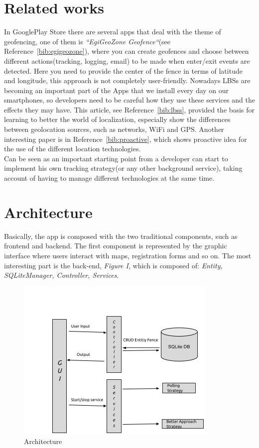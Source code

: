 \documentclass[conference]{IEEEtran}
\begin{document}
\section{Related works}
In GooglePlay Store there are several apps that deal with the theme of geofencing, one of them is 
\textit{``EgiGeoZone Geofence``}(see Reference~\ref{bib:egigeozone}), where you can create geofences and choose between different actions(tracking, logging, email) to be made when enter/exit events are detected.
Here you need to provide the center of the fence in terms of latitude and longitude, this approach is not completely user-friendly.
Nowadays LBSs are becoming an important part of the Apps that we install every day on our smartphones, so developers need to be careful how they use 
these services and the effects they may have.
This article, see Reference~\ref{bib:lbss}, provided the basis for learning to better the world of localization, especially show the differences between geolocation sources, 
such as networks, WiFi and GPS.
Another interesting paper is in Reference~\ref{bib:proactive}, which shows proactive idea for the use of the different location technologies.\\
Can be seen as an important starting point from a developer can start to implement his own tracking strategy(or any other background service), taking account of having 
to manage different technologies at the same time.

\section{Architecture}
Basically, the app is composed with the two traditional components, such as frontend and backend.
The first component is represented by the graphic interface where users interact with maps, registration forms and so on.
The most interesting part is the back-end, \textit{Figure I}, which is composed of: \textit{Entity, SQLiteManager, Controller, Services}.

\begin{figure}
\centering
\includegraphics[scale=0.6]{architecture}
\caption{Architecture}
\end{figure}
\end{document}
